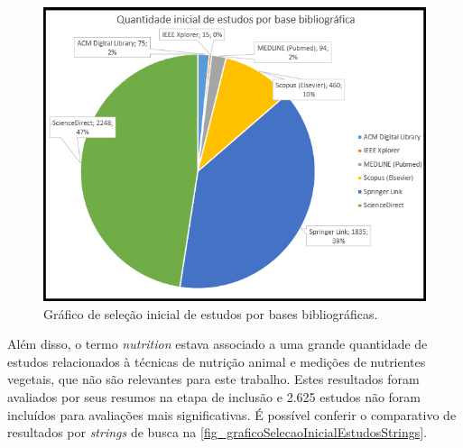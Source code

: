 \begin{figure}[htb]
	\caption{\label{fig_graficoSelecaoInicialEstudos}Gráfico de seleção inicial de estudos por bases bibliográficas.}
	\begin{center}
	    \includegraphics[scale=0.58]{Imagens/grafico - selecao inicial de estudos por base.png}
	\end{center}
\end{figure}

Além disso, o termo \textit{nutrition} estava associado a uma grande quantidade de estudos relacionados à técnicas de nutrição animal e medições de nutrientes vegetais, que não são relevantes para este trabalho. Estes resultados foram avaliados por seus resumos na etapa de inclusão e 2.625 estudos não foram incluídos para avaliações mais significativas. É possível conferir o comparativo de resultados por \textit{strings} de busca na \autoref{fig_graficoSelecaoInicialEstudosStrings}.

